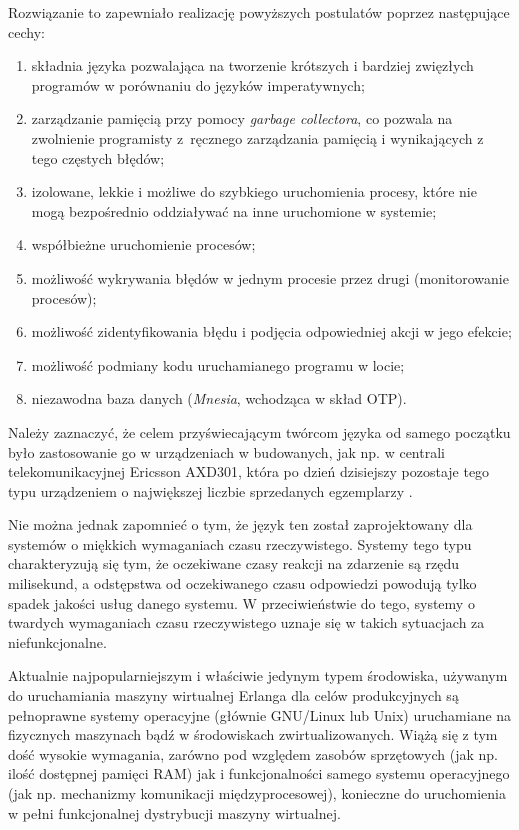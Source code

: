 Rozwiązanie to zapewniało realizację powyższych postulatów poprzez następujące cechy:
\begin{enumerate}
\item składnia języka pozwalająca na tworzenie krótszych i bardziej zwięzłych programów w porównaniu do języków imperatywnych;
\item zarządzanie pamięcią przy pomocy \emph{garbage collectora}, co pozwala na zwolnienie programisty z~ręcznego zarządzania pamięcią i wynikających z tego częstych błędów;
\item izolowane, lekkie i możliwe do szybkiego uruchomienia procesy, które nie mogą bezpośrednio oddziaływać na inne uruchomione w systemie;
\item współbieżne uruchomienie procesów;
\item możliwość wykrywania błędów w jednym procesie przez drugi (monitorowanie procesów);
\item możliwość zidentyfikowania błędu i podjęcia odpowiedniej akcji w jego efekcie;
\item możliwość podmiany kodu uruchamianego programu w locie;
\item niezawodna baza danych (\emph{Mnesia}, wchodząca w skład OTP).
\end{enumerate}

Należy zaznaczyć, że celem przyświecającym twórcom języka od samego początku było zastosowanie go w urządzeniach w budowanych, jak np. w centrali telekomunikacyjnej Ericsson AXD301, która po dzień dzisiejszy pozostaje tego typu urządzeniem o największej liczbie sprzedanych egzemplarzy \cite{armstrong2003making}.

Nie można jednak zapomnieć o tym, że język ten został zaprojektowany dla systemów o miękkich wymaganiach czasu rzeczywistego. Systemy tego typu charakteryzują się tym, że oczekiwane czasy reakcji na zdarzenie są rzędu milisekund, a odstępstwa od oczekiwanego czasu odpowiedzi powodują tylko spadek jakości usług danego systemu. W przeciwieństwie do tego, systemy o twardych wymaganiach czasu rzeczywistego uznaje się w takich sytuacjach za niefunkcjonalne.

Aktualnie najpopularniejszym i właściwie jedynym typem środowiska, używanym do uruchamiania maszyny wirtualnej Erlanga dla celów produkcyjnych są pełnoprawne systemy operacyjne (głównie GNU/Linux lub Unix) uruchamiane na fizycznych maszynach bądź w środowiskach zwirtualizowanych. Wiążą się z tym dość wysokie wymagania, zarówno pod względem zasobów sprzętowych (jak np. ilość dostępnej pamięci RAM) jak i funkcjonalności samego systemu operacyjnego (jak np. mechanizmy komunikacji międzyprocesowej), konieczne do uruchomienia w pełni funkcjonalnej dystrybucji maszyny wirtualnej.

